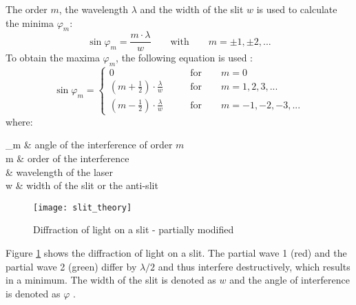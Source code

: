 The order $m$, the wavelength $\lambda$ and the width of the slit $w$ is used to calculate the minima $\varphi_m$:
\begin{equation}
\sin\varphi_m = \frac{m\cdot\lambda}{w} \qquad \text{with} \qquad m = \pm 1, \pm 2, ...
\label{eq:slit_minima}
\end{equation}
To obtain the maxima $\varphi_m$, the following equation is used \cite{uni_hamburg}:
\begin{equation}
\sin\varphi_m =
\begin{cases} 
	0 & \qquad \text{for} \qquad m = 0\\
	\left(m + \frac{1}{2}\right)\cdot\frac{\lambda}{w} & \qquad \text{for} \qquad m = 1, 2, 3, ...\\[6pt]
	\left(m - \frac{1}{2}\right)\cdot\frac{\lambda}{w} & \qquad \text{for} \qquad m = -1, -2, -3, ...
\end{cases}
\label{eq:slit_maxima}
\end{equation}
where:
\begin{conditions}
	\varphi_m & angle of the interference of order $m$ \\
	m & order of the interference \\
	\lambda & wavelength of the laser \\
	w & width of the slit or the anti-slit
\end{conditions}
\begin{figure}[H]
	\centering
	\texttt{[image: slit\_theory]}
	\caption{Diffraction of light on a slit \cite{diffraction} - partially modified}
	\label{fig:diff_slit}
\end{figure}
Figure \ref{fig:diff_slit} shows the diffraction of light on a slit. The partial wave 1 (red) and the partial wave 2 (green) differ by $\lambda/2$ and thus interfere destructively, which results in a minimum. The width of the slit is denoted as $w$ and the angle of interference is denoted as $\varphi$ \cite{diffraction}.

